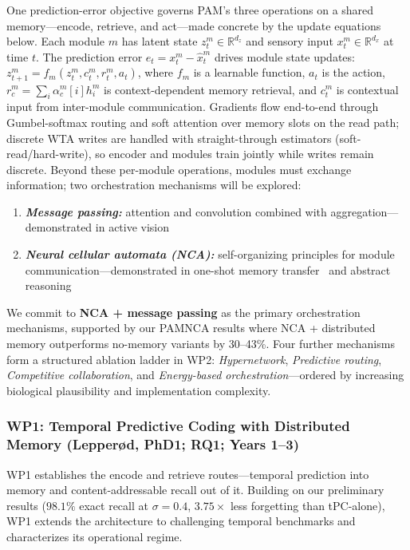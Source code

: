 One prediction-error objective governs PAM's three operations on a shared memory---encode, retrieve, and act---made concrete by the update equations below. Each module $m$ has latent state $z^m_t \in \mathbb{R}^{d_z}$ and sensory input $x^m_t \in \mathbb{R}^{d_x}$ at time $t$. The prediction error $e_t = x^m_t - \hat{x}^m_t$ drives module state updates: $z^m_{t+1} = f_m(z^m_t, c^m_t, r^m_t, a_t)$, where $f_m$ is a learnable function, $a_t$ is the action, $r^m_c = \sum_i \alpha^m_c[i]h^m_i$ is context-dependent memory retrieval, and $c^m_t$ is contextual input from inter-module communication. Gradients flow end-to-end through Gumbel-softmax routing and soft attention over memory slots on the read path; discrete WTA writes are handled with straight-through estimators (soft-read/hard-write), so encoder and modules train jointly while writes remain discrete. Beyond these per-module operations, modules must exchange information; two orchestration mechanisms will be explored:
\begin{enumerate}[noitemsep,topsep=2pt]
  \item \textbf{\textit{Message passing:}} attention and convolution combined with aggregation---demonstrated in active vision~\cite{kvalsund2026sensor}
  \item \textbf{\textit{Neural cellular automata (NCA):}} self-organizing principles for module communication---demonstrated in one-shot memory transfer~\cite{guichard2025engramnca} and abstract reasoning~\cite{guichard2025arc}
\end{enumerate}
\noindent We commit to \textbf{NCA + message passing} as the primary orchestration mechanisms, supported by our PAMNCA results where NCA + distributed memory outperforms no-memory variants by 30--43\%. Four further mechanisms form a structured ablation ladder in WP2: \textit{Hypernetwork}, \textit{Predictive routing}, \textit{Competitive collaboration}, and \textit{Energy-based orchestration}---ordered by increasing biological plausibility and implementation complexity.

\subsubsection*{WP1: Temporal Predictive Coding with Distributed Memory \textnormal{(Lepperød, PhD1; RQ1; Years 1--3)}}

WP1 establishes the encode and retrieve routes---temporal prediction into memory and content-addressable recall out of it. Building on our preliminary results ($98.1\%$ exact recall at $\sigma{=}0.4$, $3.75{\times}$ less forgetting than tPC-alone), WP1 extends the architecture to challenging temporal benchmarks and characterizes its operational regime.

